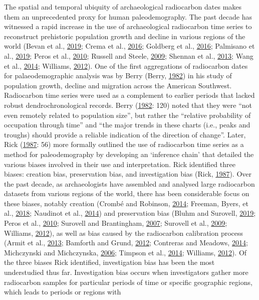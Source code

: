 \documentclass[
]{sa}
\begin{document}
The spatial and temporal ubiquity of archaeological radiocarbon dates makes them an unprecedented proxy for human paleodemography. The past decade has witnessed a rapid increase in the use of archaeological radiocarbon time series to reconstruct prehistoric population growth and decline in various regions of the world (Bevan et al., \protect\hyperlink{ref-Bevan2019}{2019}; Crema et al., \protect\hyperlink{ref-Crema2016}{2016}; Goldberg et al., \protect\hyperlink{ref-Goldberg2016}{2016}; Palmisano et al., \protect\hyperlink{ref-Palmisano2019}{2019}; Peros et al., \protect\hyperlink{ref-Peros2010}{2010}; Russell and Steele, \protect\hyperlink{ref-Russell2009}{2009}; Shennan et al., \protect\hyperlink{ref-Shennan2013}{2013}; Wang et al., \protect\hyperlink{ref-Wang2014}{2014}; Williams, \protect\hyperlink{ref-Williams2012}{2012}). One of the first aggregations of radiocarbon dates for palaeodemographic analysis was by Berry (Berry, \protect\hyperlink{ref-Berry1982}{1982}) in his study of population growth, decline and migration across the American Southwest. Radiocarbon time series were used as a complement to earlier periods that lacked robust dendrochronological records. Berry (\protect\hyperlink{ref-Berry1982}{1982}: 120) noted that they were ``not even remotely related to population size'', but rather the ``relative probability of occupation through time'' and ``the major trends in these charts (i.e., peaks and troughs) should provide a reliable indication of the direction of change''. Later, Rick (\protect\hyperlink{ref-Rick1987}{1987}: 56) more formally outlined the use of radiocarbon time series as a method for paleodemography by developing an `inference chain' that detailed the various biases involved in their use and interpretation. Rick identified three biases: creation bias, preservation bias, and investigation bias (Rick, \protect\hyperlink{ref-Rick1987}{1987}). Over the past decade, as archaeologists have assembled and analysed large radiocarbon datasets from various regions of the world, there has been considerable focus on these biases, notably creation (Crombé and Robinson, \protect\hyperlink{ref-Crombe2014}{2014}; Freeman, Byers, et al., \protect\hyperlink{ref-Freeman2018}{2018}; Naudinot et al., \protect\hyperlink{ref-Naudinot2014}{2014}) and preservation bias (Bluhm and Surovell, \protect\hyperlink{ref-Bluhm2019}{2019}; Peros et al., \protect\hyperlink{ref-Peros2010}{2010}; Surovell and Brantingham, \protect\hyperlink{ref-Surovell2007}{2007}; Surovell et al., \protect\hyperlink{ref-Surovell2009}{2009}; Williams, \protect\hyperlink{ref-Williams2012}{2012}), as well as bias caused by the radiocarbon calibration process (Armit et al., \protect\hyperlink{ref-Armit2013}{2013}; Bamforth and Grund, \protect\hyperlink{ref-Bamforth2012}{2012}; Contreras and Meadows, \protect\hyperlink{ref-Contreras2014}{2014}; Michczynski and Michczynska, \protect\hyperlink{ref-Michczynski2006}{2006}; Timpson et al., \protect\hyperlink{ref-Timpson2014}{2014}; Williams, \protect\hyperlink{ref-Williams2012}{2012}). Of the three biases Rick identified, investigation bias has been the most understudied thus far. Investigation bias occurs when investigators gather more radiocarbon samples for particular periods of time or specific geographic regions, which leads to periods or regions with 
\end{document}
